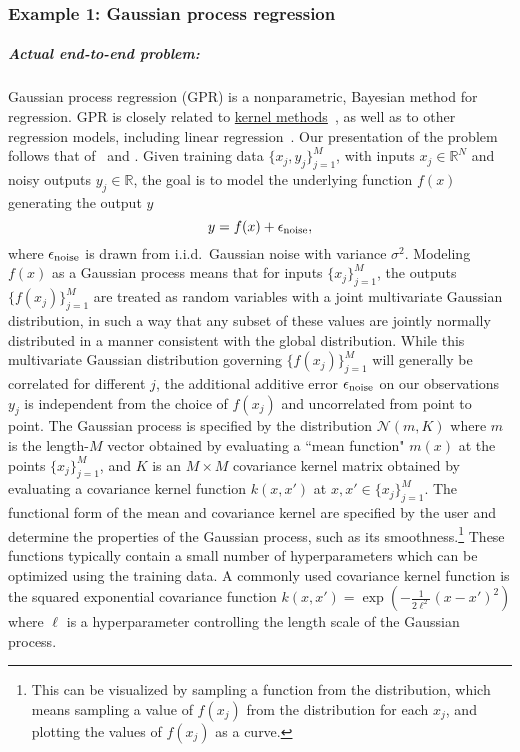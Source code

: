 \begin{refsection}
\subsubsection*{Example 1: Gaussian process regression}
%

\subparagraph{Actual end-to-end problem:}
Gaussian process regression (GPR) is a nonparametric, Bayesian method for regression. GPR is closely related to \hyperref[appl:NearTermML]{kernel methods}~\cite{kanagawa2018gaussian}, as well as to other regression models, including linear regression~\cite{rasmussen2005GaussianProcessTextbook}. Our presentation of the problem follows that of~\cite[Chapter 2]{rasmussen2005GaussianProcessTextbook} and \cite{zhao2019TrainingGaussianProcess}. Given training data $\{x_j,y_j\}_{j=1}^M$, with inputs $x_j \in \mathbb{R}^N$ and noisy outputs $y_j\in\mathbb{R}$, the goal is to model the underlying function $f(x)$ generating the output $y$
\begin{equation}
    y=f(x)+\epsilon_{\rm noise},
\end{equation}
where $\epsilon_{\rm noise}$ is drawn from i.i.d.~Gaussian noise with variance $\sigma^2$. Modeling $f(x)$ as a Gaussian process means that for inputs $\{x_j\}_{j=1}^M$, the outputs $\{f(x_j)\}_{j=1}^M$ are treated as random variables with a joint multivariate Gaussian distribution, in such a way that any subset of these values are jointly normally distributed in a manner consistent with the global distribution. While this multivariate Gaussian distribution governing $\{f(x_j)\}_{j=1}^M$ will generally be correlated for different $j$, the additional additive error $\epsilon_{\rm noise}$ on our observations $y_j$ is independent from the choice of $f(x_j)$ and uncorrelated from point to point. The Gaussian process is specified by the distribution $\mathcal{N}\left( m, K \right)$ where $m$ is the length-$M$ vector obtained by evaluating a ``mean function" $m(x)$ at the points $\{x_j\}_{j=1}^M$, and $K$ is an $M \times M$ covariance kernel matrix obtained by evaluating a covariance kernel function $k(x,x')$ at $x,x' \in \{x_j\}_{j=1}^M$. The functional form of the mean and covariance kernel are specified by the user and determine the properties of the Gaussian process, such as its smoothness.\footnote{This can be visualized by sampling a function from the distribution, which means sampling a value of $f(x_j)$ from the distribution for each $x_j$, and plotting the values of $f(x_j)$ as a curve.} These functions typically contain a small number of hyperparameters which can be optimized using the training data. A commonly used covariance kernel function is the squared exponential covariance function $k(x,x') = \exp{\left(-\frac{1}{2\ell^2} (x-x')^2\right)}$ where $\ell$ is a hyperparameter controlling the length scale of the Gaussian process.    


\end{refsection}
